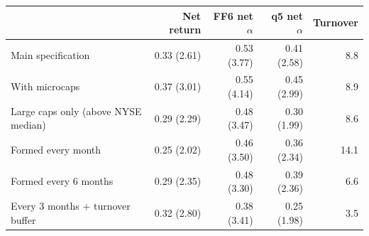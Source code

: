 \begin{tabular}{lrrrr}
\toprule
 & Net return & FF6 net $\alpha$ & q5 net $\alpha$ & Turnover \\
\midrule
Main specification & 0.33 (2.61) & 0.53 (3.77) & 0.41 (2.58) & 8.8 \\
With microcaps & 0.37 (3.01) & 0.55 (4.14) & 0.45 (2.99) & 8.9 \\
Large caps only (above NYSE median) & 0.29 (2.29) & 0.48 (3.47) & 0.30 (1.99) & 8.6 \\
Formed every month & 0.25 (2.02) & 0.46 (3.50) & 0.36 (2.34) & 14.1 \\
Formed every 6 months & 0.29 (2.35) & 0.48 (3.30) & 0.39 (2.36) & 6.6 \\
Every 3 months + turnover buffer & 0.32 (2.80) & 0.38 (3.41) & 0.25 (1.98) & 3.5 \\
\bottomrule
\end{tabular}
